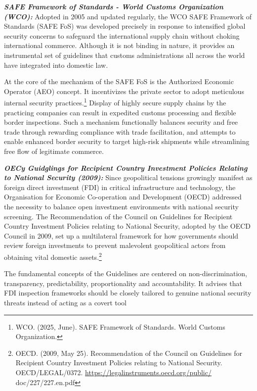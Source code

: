 \emph{\textbf{SAFE Framework of Standards - World Customs Organization (WCO):}} Adopted in 2005 and updated regularly, the WCO SAFE Framework of Standards (SAFE FoS) was developed precisely in response to intensified global security concerns to safeguard the international supply chain without choking international commerce. Although it is not binding in nature, it provides an instrumental set of guidelines that customs administrations all across the world have integrated into domestic law.

At the core of the mechanism of the SAFE FoS is the Authorized Economic Operator (AEO) concept. It incentivizes the private sector to adopt meticulous internal security practices.\footnote{WCO. (2025, June). SAFE Framework of Standards. World Customs Organization.} Display of highly secure supply chains by the practicing companies can result in expedited customs processing and flexible border inspections. Such a mechanism functionally balances security and free trade through rewarding compliance with trade facilitation, and attempts to enable enhanced border security to target high-risk shipments while streamlining free flow of legitimate commerce.

\emph{\textbf{OECy Guidglings for Recipient Country Investment Policies Relating to National Security (2009):}} Since geopolitical tensions growingly manifest as foreign direct investment (FDI) in critical infrastructure and technology, the Organisation for Economic Co-operation and Development (OECD) addressed the necessity to balance open investment environments with national security screening. The Recommendation of the Council on Guidelines for Recipient Country Investment Policies relating to National Security, adopted by the OECD Council in 2009, set up a multilateral framework for how governments should review foreign investments to prevent malevolent geopolitical actors from obtaining vital domestic assets.\footnote{OECD. (2009, May 25). Recommendation of the Council on Guidelines for Recipient Country Investment Policies relating to National Security. OECD/LEGAL/0372. \url{https://legalinstruments.oecd.org/public/} doc/227/227.en.pdf}

The fundamental concepts of the Guidelines   are  centered  on non-discrimination, transparency, predictability, proportionality and accountability. It advises that FDI inspection frameworks should be closely tailored to genuine national security threats instead of acting as a covert tool


